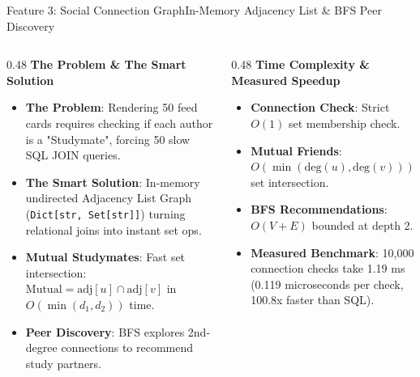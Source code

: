 \documentclass[aspectratio=169,10pt]{beamer}
\begin{document}
\begin{frame}[fragile,t]{Feature 3: Social Connection Graph}{In-Memory Adjacency List \& BFS Peer Discovery}
  \begin{columns}[t]
    \begin{column}{0.48\textwidth}
      {\fontsize{9.0}{11.0}\selectfont\textbf{\textcolor{KoinexaRed}{The Problem \& The Smart Solution}}}\par\vspace{1.5pt}
      \begin{itemize}\setlength{\itemsep}{1.5pt}
        \item {\fontsize{8.0}{9.8}\selectfont \textbf{The Problem}: Rendering 50 feed cards requires checking if each author is a "Studymate", forcing 50 slow SQL JOIN queries.}
        \item {\fontsize{8.0}{9.8}\selectfont \textbf{The Smart Solution}: In-memory undirected Adjacency List Graph (\texttt{Dict[str, Set[str]]}) turning relational joins into instant set ops.}
        \item {\fontsize{8.0}{9.8}\selectfont \textbf{Mutual Studymates}: Fast set intersection: $\text{Mutual} = \text{adj}[u] \cap \text{adj}[v]$ in $O(\min(d_1, d_2))$ time.}
        \item {\fontsize{8.0}{9.8}\selectfont \textbf{Peer Discovery}: BFS explores 2nd-degree connections to recommend study partners.}
      \end{itemize}
    \end{column}
    \begin{column}{0.48\textwidth}
      {\fontsize{9.0}{11.0}\selectfont\textbf{\textcolor{KoinexaOrange}{Time Complexity \& Measured Speedup}}}\par\vspace{1.5pt}
      \begin{itemize}\setlength{\itemsep}{1.2pt}
        \item {\fontsize{8.0}{9.8}\selectfont \textbf{Connection Check}: Strict $O(1)$ set membership check.}
        \item {\fontsize{8.0}{9.8}\selectfont \textbf{Mutual Friends}: $O(\min(\text{deg}(u), \text{deg}(v)))$ set intersection.}
        \item {\fontsize{8.0}{9.8}\selectfont \textbf{BFS Recommendations}: $O(V + E)$ bounded at depth 2.}
        \item {\fontsize{8.0}{9.8}\selectfont \textbf{Measured Benchmark}: 10,000 connection checks take 1.19 ms (0.119 microseconds per check, 100.8x faster than SQL).}

\end{itemize}
\end{column}
\end{columns}
\end{frame}
\end{document}
